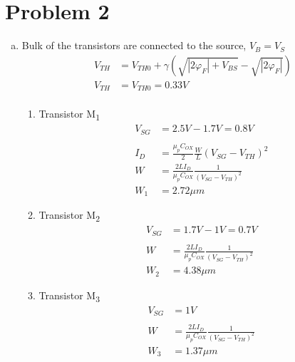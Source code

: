 \documentclass{article}
\begin{document}
\section{Problem 2}
\label{sec:org4e27edf}
\begin{enumerate}[(a)]
\item Bulk of the transistors are connected to the source, \(V_{B} = V_{S}\)
\begin{equation*}
\begin{aligned}
V_{TH} &= V_{TH0} + \gamma{}(\sqrt{|2\varphi_{F}| + V_{BS}} - \sqrt{|2\varphi_{F}|}) \\
V_{TH} &= V_{TH0} = 0.33 V \\
\end{aligned}
\end{equation*}

\begin{enumerate}[1.]
\item Transistor M\textsubscript{1}
\begin{equation*}
\begin{aligned}
V_{SG} &= 2.5V - 1.7 V  = 0.8 V \\
\\
I_{D} &= \frac{\mu_{p}C_{OX}}{2}\frac{W}{L}(V_{SG} - V_{TH})^{2} \\
W &= \frac{2LI_{D}}{\mu_{p}C_{OX}}\frac{1}{(V_{SG} - V_{TH})^{2}} \\
W_{1} &= 2.72 \mu{}m
\end{aligned}
\end{equation*}

\item Transistor M\textsubscript{2}
\begin{equation*}
\begin{aligned}
V_{SG} &= 1.7 V - 1 V  = 0.7 V \\
\\
W &= \frac{2LI_{D}}{\mu_{p}C_{OX}}\frac{1}{(V_{SG} - V_{TH})^{2}} \\
W_{2} &= 4.38 \mu{}m
\end{aligned}
\end{equation*}

\item Transistor M\textsubscript{3}
\begin{equation*}
\begin{aligned}
V_{SG} &= 1 V \\
\\
W &= \frac{2LI_{D}}{\mu_{p}C_{OX}}\frac{1}{(V_{SG} - V_{TH})^{2}} \\
W_{3} &= 1.37 \mu{}m
\end{aligned}
\end{equation*}
\end{enumerate}


\end{enumerate}
\end{document}
